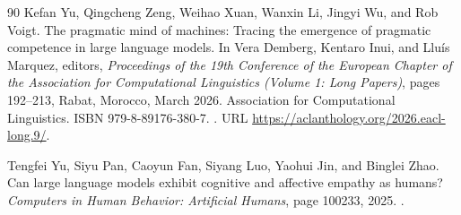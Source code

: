 \begin{thebibliography}{90}
Kefan Yu, Qingcheng Zeng, Weihao Xuan, Wanxin Li, Jingyi Wu, and Rob Voigt.
\newblock The pragmatic mind of machines: Tracing the emergence of pragmatic competence in large language models.
\newblock In Vera Demberg, Kentaro Inui, and Llu{\'i}s Marquez, editors, \emph{Proceedings of the 19th Conference of the {E}uropean Chapter of the {A}ssociation for {C}omputational {L}inguistics (Volume 1: Long Papers)}, pages 192--213, Rabat, Morocco, March 2026. Association for Computational Linguistics.
\newblock ISBN 979-8-89176-380-7.
\newblock {}.
\newblock URL \url{https://aclanthology.org/2026.eacl-long.9/}.

Tengfei Yu, Siyu Pan, Caoyun Fan, Siyang Luo, Yaohui Jin, and Binglei Zhao.
\newblock Can large language models exhibit cognitive and affective empathy as humans?
\newblock \emph{Computers in Human Behavior: Artificial Humans}, page 100233, 2025.
\newblock {}.

\end{thebibliography}
